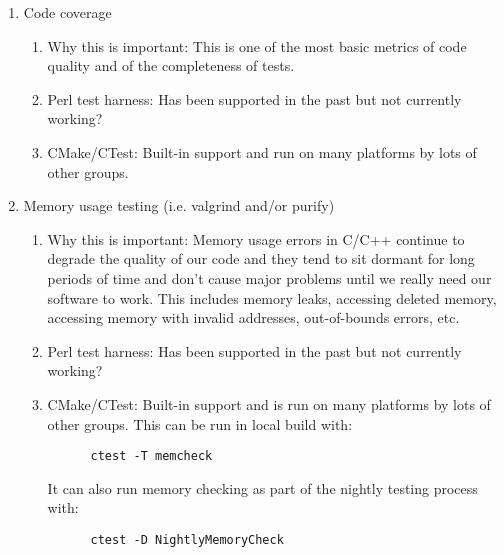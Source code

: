 \documentclass[pdf,ps2pdf,11pt]{SANDreport}
\begin{document}
\begin{enumerate}

{}\item Code coverage

  \begin{enumerate}

  {}\item Why this is important: This is one of the most basic
  metrics of code quality and of the completeness of tests.

  {}\item Perl test harness: Has been supported in the past but not
  currently working?

  {}\item CMake/CTest: Built-in support and run on many platforms by
  lots of other groups.

  \end{enumerate}

{}\item Memory usage testing (i.e. valgrind and/or purify)

  \begin{enumerate}

  {}\item Why this is important: Memory usage errors in C/C++
  continue to degrade the quality of our code and they tend to sit
  dormant for long periods of time and don't cause major problems
  until we really need our software to work.  This includes memory
  leaks, accessing deleted memory, accessing memory with invalid
  addresses, out-of-bounds errors, etc.

  {}\item Perl test harness: Has been supported in the past but not
  currently working?

  {}\item CMake/CTest: Built-in support and is run on many platforms
  by lots of other groups.  This can be run in local build with:

    \begin{verbatim}
      ctest -T memcheck
    \end{verbatim}

  It can also run memory checking as part of the nightly testing
  process with:

    \begin{verbatim}
      ctest -D NightlyMemoryCheck
    \end{verbatim}

  \end{enumerate}


\end{enumerate}
\end{document}

